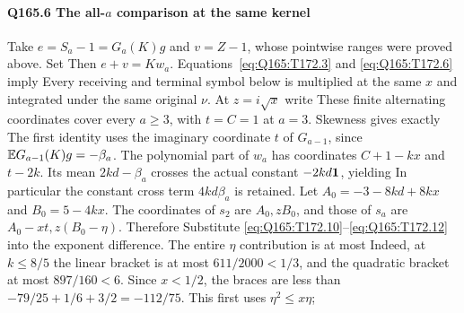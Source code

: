 \paragraph{Q165.6 The all-$a$ comparison at the same kernel}\label{part:Q165.6}
Take $e=\allowbreak S_a-1=\allowbreak G_a(K)g$ and $v=\allowbreak Z-1$, whose pointwise ranges were
proved above. Set
Then $e+v=\allowbreak Kw_a$. Equations~\eqref{eq:Q165:T172.3} and
\eqref{eq:Q165:T172.6} imply
Every receiving and terminal symbol below is multiplied at the same
$x$ and integrated under the same original $\nu$.
At $z=\allowbreak i\sqrt x$ write
These finite alternating coordinates cover every $a\ge\allowbreak 3$, with
$t=\allowbreak C=\allowbreak 1$ at $a=\allowbreak 3$. Skewness gives exactly
The first identity uses the imaginary coordinate $t$ of $G_{a-1}$,
since $\mathbb E G_{a-1}(K)g=\allowbreak -\beta_a$.
The polynomial part of $w_a$ has coordinates $C+1-kx$ and $t-2k$.
Its mean $2kd-\beta_a$ crosses the actual constant $-2kd\mathbf1$, yielding
In particular the constant cross term $4kd\beta_a$ is retained.
Let $A_0=\allowbreak -3-8kd+8kx$ and $B_0=\allowbreak 5-4kx$. The coordinates of $s_2$ are
$A_0,\allowbreak zB_0$, and those of $s_a$ are $A_0-xt,\allowbreak z(B_0-\eta)$.
Therefore
Substitute \eqref{eq:Q165:T172.10}--\eqref{eq:Q165:T172.12} into the
exponent difference. The entire $\eta$ contribution is at most
Indeed, at $k\le\allowbreak 8/5$ the linear bracket is at most
$611/2000<\allowbreak 1/3$, and the quadratic bracket at most $897/160<\allowbreak 6$.
Since $x<\allowbreak 1/2$, the braces are less than
$-79/25+1/6+3/2=\allowbreak -112/75$. This first uses $\eta^2\le\allowbreak  x\eta$;
